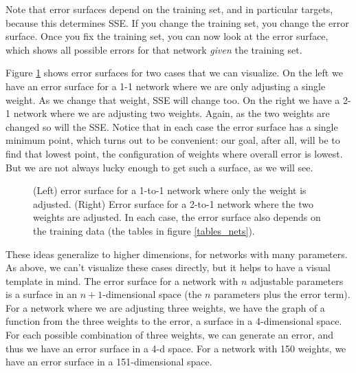 Note that error surfaces depend on the training set, and in particular targets, because this determines SSE. If you change the training set, you change the error surface. Once you fix the training set, you can now look at the error surface, which shows all possible errors for that network \emph{given} the training set.

Figure \ref{error_surfaces} shows error surfaces for two cases that we can visualize. On the left we have an error surface for a 1-1 network where we are only adjusting a single weight. As we change that weight, SSE will change too. On the right we have a 2-1 network where we are adjusting two weights. Again, as the two weights are changed so will the SSE. Notice that in each case the error surface has a single minimum point, which turns out to be convenient: our goal, after all, will be to find that lowest point, the configuration of weights where overall error is lowest.  But we are not always lucky enough to get such a surface, as we will see.

\begin{figure}[h]
\centering
{}
\caption[Jeff Yoshimi.]{(Left) error surface for a 1-to-1 network where only the weight is adjusted. (Right) Error surface for a 2-to-1 network where the two weights are adjusted. In each case, the error surface also depends on the training data (the tables in figure \ref{tables_nets}). }
\label{error_surfaces}
\end{figure}

These ideas generalize to higher dimensions, for networks with many parameters. As above, we can't visualize these cases directly, but it helps to have a visual template in mind. The error surface for a network with $n$ adjustable parameters is a surface in an $n+1$-dimensional space (the $n$ parameters plus the error term). For a network where we are adjusting three weights, we have the graph of a function from the three weights to the error, \ie a surface in a 4-dimensional space. For each possible combination of three weights, we can generate an error, and thus we have an error surface in a 4-d space. For a network with 150 weights, we have an error surface in a 151-dimensional space.

